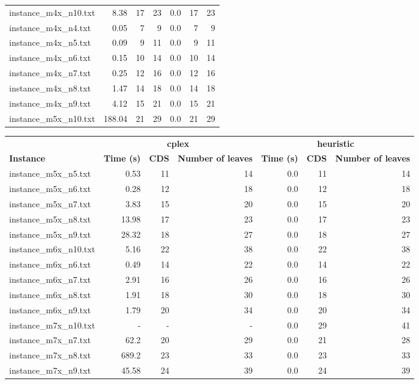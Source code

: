 \documentclass{article}
\begin{document}
\begin{center}
\begin{tabular}{lrrrrrr}
instance\_m4x\_n10.txt & 8.38 & 17 & 23
 & 0.0 & 17 & 23
\\
instance\_m4x\_n4.txt & 0.05 & 7 & 9
 & 0.0 & 7 & 9
\\
instance\_m4x\_n5.txt & 0.09 & 9 & 11
 & 0.0 & 9 & 11
\\
instance\_m4x\_n6.txt & 0.15 & 10 & 14
 & 0.0 & 10 & 14
\\
instance\_m4x\_n7.txt & 0.25 & 12 & 16
 & 0.0 & 12 & 16
\\
instance\_m4x\_n8.txt & 1.47 & 14 & 18
 & 0.0 & 14 & 18
\\
instance\_m4x\_n9.txt & 4.12 & 15 & 21
 & 0.0 & 15 & 21
\\
instance\_m5x\_n10.txt & 188.04 & 21 & 29
 & 0.0 & 21 & 29
\\
\hline\end{tabular}
\end{center}
\newpage
\begin{center}
\renewcommand{\arraystretch}{1.4}
 \begin{tabular}{lrrrrrr}
	\hline
 & \multicolumn{3}{c}{\textbf{cplex}} & \multicolumn{3}{c}{\textbf{heuristic}}\\
\textbf{Instance}  & \textbf{Time (s)} & \textbf{CDS} & \textbf{Number of leaves}   & \textbf{Time (s)} & \textbf{CDS} & \textbf{Number of leaves}  \\\hline

instance\_m5x\_n5.txt & 0.53 & 11 & 14
 & 0.0 & 11 & 14
\\
instance\_m5x\_n6.txt & 0.28 & 12 & 18
 & 0.0 & 12 & 18
\\
instance\_m5x\_n7.txt & 3.83 & 15 & 20
 & 0.0 & 15 & 20
\\
instance\_m5x\_n8.txt & 13.98 & 17 & 23
 & 0.0 & 17 & 23
\\
instance\_m5x\_n9.txt & 28.32 & 18 & 27
 & 0.0 & 18 & 27
\\
instance\_m6x\_n10.txt & 5.16 & 22 & 38
 & 0.0 & 22 & 38
\\
instance\_m6x\_n6.txt & 0.49 & 14 & 22
 & 0.0 & 14 & 22
\\
instance\_m6x\_n7.txt & 2.91 & 16 & 26
 & 0.0 & 16 & 26
\\
instance\_m6x\_n8.txt & 1.91 & 18 & 30
 & 0.0 & 18 & 30
\\
instance\_m6x\_n9.txt & 1.79 & 20 & 34
 & 0.0 & 20 & 34
\\
instance\_m7x\_n10.txt & - & - & - 
 & 0.0 & 29 & 41
\\
instance\_m7x\_n7.txt & 62.2 & 20 & 29
 & 0.0 & 21 & 28
\\
instance\_m7x\_n8.txt & 689.2 & 23 & 33
 & 0.0 & 23 & 33
\\
instance\_m7x\_n9.txt & 45.58 & 24 & 39
 & 0.0 & 24 & 39
\\
\hline\end{tabular}
\end{center}
\end{document}
